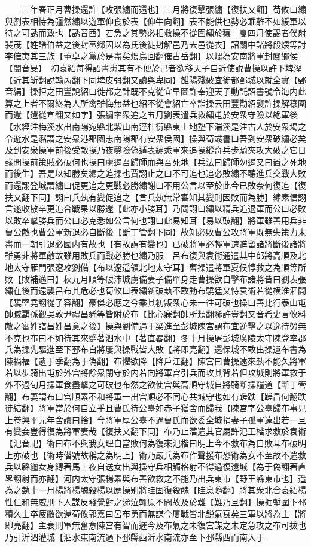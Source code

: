 　　三年春正月曹操還許【攻張繡而還也】三月將復擊張繡【復扶又翻】荀攸曰繡與劉表相恃為彊然繡以遊軍仰食於表【仰牛向翻】表不能供也勢必乖離不如緩軍以待之可誘而致也【誘音酉】若急之其勢必相救操不從圍繡於穰　夏四月使謁者僕射裴茂【姓譜伯益之後封䓃鄉因以為氏後徙封解邑乃去邑從衣】詔關中諸將段煨等討李傕夷其三族【董卓之黨於是盡矣煨烏回翻傕古岳翻】以煨為安南將軍封閺鄉侯【閺音旻】　初袁紹每得詔書患其有不便於己者欲移天子自近使說曹操以許下埤溼【近其靳翻說輸芮翻下同埤皮弭翻又讀與卑同】雒陽殘破宜徙都鄄城以就全實【鄄音絹】操拒之田豐說紹曰徙都之計既不克從宜早圖許奉迎天子動託詔書號令海内此算之上者不爾終為人所禽雖悔無益也紹不從會紹亡卒詣操云田豐勸紹襲許操解穰圍而還【還從宣翻又如字】張繡率衆追之五月劉表遣兵救繡屯於安衆守險以絶軍後【水經注梅溪水出南陽宛縣北紫山南逕杜衍縣東土地墊下湍溪是注古人於安衆堨之令遊水是瀦謂之安衆港郡國志南陽郡有安衆侯國】操與荀彧書曰吾到安衆破繡必矣及到安衆操軍前後受敵操乃夜鑿險偽遁表繡悉軍來追操縱奇兵步騎夾攻大破之它日彧問操前策賊必破何也操曰虜遏吾歸師而與吾死地【兵法曰歸師勿遏又曰置之死地而後生】吾是以知勝矣繡之追操也賈詡止之曰不可追也追必敗繡不聽進兵交戰大敗而還詡登城謂繡曰促更追之更戰必勝繡謝曰不用公言以至於此今已敗奈何復追【復扶又翻下同】詡曰兵埶有變促追之【言兵埶無常審知其變則因敗而為勝】繡素信詡言遂收散卒更追合戰果以勝還【此亦小勝耳】乃問詡曰繡以精兵追退軍而公曰必敗以敗卒擊勝兵而公曰必克悉如公言何也詡曰此易知耳【易以䜴翻】將軍雖善用兵非曹公敵也曹公軍新退必自斷後【斷丁管翻下同】故知必敗曹公攻將軍既無失策力未盡而一朝引退必國内有故也【有故謂有變也】已破將軍必輕軍速進留諸將斷後諸將雖勇非將軍敵故雖用敗兵而戰必勝也繡乃服　呂布復與袁術通遣其中郎將高順及北地太守雁門張遼攻劉備【布以遼遥領北地太守耳】曹操遣將軍夏侯惇救之為順等所敗【敗補邁曰】秋九月順等破沛城虜備妻子備單身走曹操欲自擊布諸將皆曰劉表張繡在後而遠襲呂布其危必也荀攸曰表繡新破埶不敢動布驍猛又恃袁術若從横淮泗間【驍堅堯翻從子容翻】豪傑必應之今乘其初叛衆心未一往可破也操曰善比行泰山屯帥臧覇孫觀吳敦尹禮昌豨等皆附於布【比心寐翻帥所類翻豨許豈翻又音希史言攸料敵之審姓譜昌姓昌意之後】操與劉備遇于梁進至彭城陳宫謂布宜逆擊之以逸待勞無不克也布曰不如待其來蹙著泗水中【著直畧翻】冬十月操屠彭城廣陵太守陳登率郡兵為操先驅進至下邳布自將屢與操戰皆大敗【將即亮翻】還保城不敢出操遺布書為陳禍福【遺于季翻為于偽翻】布懼欲降【降戶江翻】陳宫曰曹操遠來埶不能久將軍若以步騎出屯於外宫將餘衆閉守於内若向將軍宫引兵而攻其背若但攻城則將軍救于外不過旬月操軍食盡擊之可破也布然之欲使宫與高順守城自將騎斷操糧道【斷丁管翻】布妻謂布曰宫順素不和將軍一出宫順必不同心共城守也如有蹉跌【蹉昌何翻跌徒結翻】將軍當於何自立乎且曹氏待公臺如赤子猶舍而歸我【陳宫字公臺歸布事見上卷興平元年舍讀曰捨】今將軍厚公臺不過曹氏而欲委全城捐妻子孤軍遠出若一旦有變妾豈得復為將軍妻哉【復扶又翻下同】布乃止濳遣其官屬許汜王楷求救於袁術【汜音祀】術曰布不與我女理自當敗何為復來汜楷曰明上今不救布為自敗耳布破明上亦破也【術時僭號故稱之為明上】術乃嚴兵為布作聲援布恐術為女不至故不遣救兵以緜纒女身縳著馬上夜自送女出與操守兵相觸格射不得過復還城【為于偽翻著直畧翻射而亦翻】河内太守張楊素與布善欲救之不能乃出兵東市【野王縣東市也】遥為之埶十一月楊將楊醜殺楊以應操别將眭固復殺醜【眭息隨翻】將其衆北合袁紹楊性仁和無威刑下人謀反發覺對之涕泣輒原不問故及於難【難乃旦翻】操掘塹圍下邳積久士卒疲敝欲還荀攸郭嘉曰呂布勇而無謀今屢戰皆北鋭氣衰矣三軍以將為主【將即亮翻】主衰則軍無奮意陳宫有智而遲今及布氣之未復宫謀之未定急攻之布可拔也乃引沂泗灌城【泗水東南流過下邳縣西沂水南流亦至下邳縣西而南入于